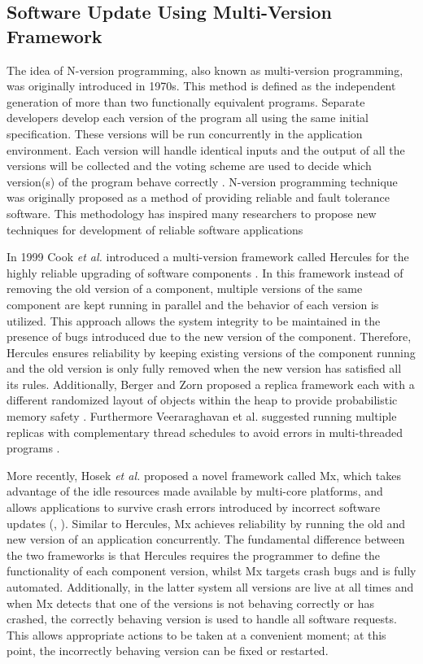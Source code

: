 \documentclass[a4paper,11pt,twoside]{article}
\begin{document}
\subsection{Software Update Using Multi-Version Framework} \label{upgrade1} 
The idea of N-version programming, also known as multi-version programming, was originally introduced in 1970s. This method is defined as the independent generation of more than two functionally equivalent programs. Separate developers develop each version of the program all using the same initial specification. These versions will be run concurrently in the application environment. Each version will handle identical inputs and the output of all the versions will be collected and the voting scheme are used to decide which version(s) of the program behave correctly \cite{N-version programming}. N-version programming technique was originally proposed as a method of providing reliable and fault tolerance software. This methodology has inspired many researchers to propose new techniques for development of reliable software applications 

In 1999 Cook \textit{et al.} introduced a multi-version framework called Hercules for the highly reliable upgrading of software components \cite{Cook}. In this framework instead of removing the old version of a component, multiple versions of the same component are kept running in parallel and the behavior of each version is utilized. This approach allows the system integrity to be maintained in the presence of bugs introduced due to the new version of the component. Therefore, Hercules ensures reliability by keeping existing versions of the component running and the old version is only fully removed when the new version has satisfied all its rules. Additionally, Berger and Zorn proposed a replica framework each with a different randomized layout of objects within the heap to provide probabilistic memory safety \cite{Berger}. Furthermore Veeraraghavan et al. suggested running multiple replicas with complementary thread schedules to avoid errors in multi-threaded programs \cite{Veeraraghavan}. 

More recently, Hosek \textit{et al.} proposed a novel framework called Mx, which takes advantage of the idle resources made available by multi-core platforms, and allows applications to survive crash errors introduced by incorrect software updates (\cite{Cadar1}, \cite{Cadar2}). Similar to Hercules, Mx achieves reliability by running the old and new version of an application concurrently. The fundamental difference between the two frameworks is that Hercules requires the programmer to define the functionality of each component version, whilst Mx targets crash bugs and is fully automated. Additionally, in the latter system all versions are live at all times and when Mx detects that one of the versions is not behaving correctly or has crashed, the correctly behaving version is used to handle all software requests. This allows appropriate actions to be taken at a convenient moment; at this point, the incorrectly behaving version can be fixed or restarted. 
\end{document}
